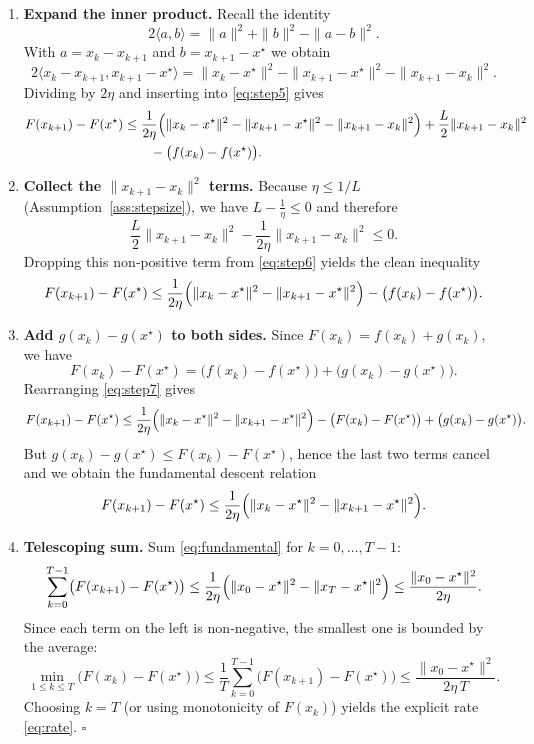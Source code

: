 \documentclass{article}
\begin{document}
\begin{enumerate}
\item[Step 6.] \textbf{Expand the inner product.}
Recall the identity
\[
2\langle a,b\rangle = \|a\|^{2}+\|b\|^{2}-\|a-b\|^{2}.
\]
With $a=x_{k}-x_{k+1}$ and $b=x_{k+1}-x^{\star}$ we obtain
\[
2\langle x_{k}-x_{k+1},x_{k+1}-x^{\star}\rangle
= \|x_{k}-x^{\star}\|^{2}-\|x_{k+1}-x^{\star}\|^{2}
-\|x_{k+1}-x_{k}\|^{2}.
\]
Dividing by $2\eta$ and inserting into \eqref{eq:step5} gives
\begin{align}
F(x_{k+1})-F(x^{\star})
&\le \frac{1}{2\eta}\Bigl(\|x_{k}-x^{\star}\|^{2}
-\|x_{k+1}-x^{\star}\|^{2}
-\|x_{k+1}-x_{k}\|^{2}\Bigr)
+\frac{L}{2}\|x_{k+1}-x_{k}\|^{2}\nonumber\\
&\qquad -\bigl(f(x_{k})-f(x^{\star})\bigr).\label{eq:step6}
\end{align}

\item[Step 7.] \textbf{Collect the $\|x_{k+1}-x_{k}\|^{2}$ terms.}
Because $\eta\le 1/L$ (Assumption~\ref{ass:stepsize}), we have
$L-\frac{1}{\eta}\le 0$ and therefore
\[
\frac{L}{2}\|x_{k+1}-x_{k}\|^{2}
-\frac{1}{2\eta}\|x_{k+1}-x_{k}\|^{2}
\le 0.
\]
Dropping this non‑positive term from \eqref{eq:step6} yields the clean
inequality
\begin{equation}
\label{eq:step7}
F(x_{k+1})-F(x^{\star})
\le \frac{1}{2\eta}\Bigl(\|x_{k}-x^{\star}\|^{2}
-\|x_{k+1}-x^{\star}\|^{2}\Bigr)
-\bigl(f(x_{k})-f(x^{\star})\bigr).
\end{equation}

\item[Step 8.] \textbf{Add $g(x_{k})-g(x^{\star})$ to both sides.}
Since $F(x_{k})=f(x_{k})+g(x_{k})$, we have
\[
F(x_{k})-F(x^{\star}) = \bigl(f(x_{k})-f(x^{\star})\bigr)
+\bigl(g(x_{k})-g(x^{\star})\bigr).
\]
Rearranging \eqref{eq:step7} gives
\begin{equation}
\label{eq:step8}
F(x_{k+1})-F(x^{\star})
\le \frac{1}{2\eta}\Bigl(\|x_{k}-x^{\star}\|^{2}
-\|x_{k+1}-x^{\star}\|^{2}\Bigr)
- \bigl(F(x_{k})-F(x^{\star})\bigr)
+\bigl(g(x_{k})-g(x^{\star})\bigr).
\end{equation}
But $g(x_{k})-g(x^{\star})\le F(x_{k})-F(x^{\star})$, hence the last two
terms cancel and we obtain the fundamental descent relation
\begin{equation}
\label{eq:fundamental}
F(x_{k+1})-F(x^{\star})
\le \frac{1}{2\eta}\Bigl(\|x_{k}-x^{\star}\|^{2}
-\|x_{k+1}-x^{\star}\|^{2}\Bigr).
\end{equation}

\item[Step 9.] \textbf{Telescoping sum.}
Sum \eqref{eq:fundamental} for $k=0,\dots,T-1$:
\[
\sum_{k=0}^{T-1}\bigl(F(x_{k+1})-F(x^{\star})\bigr)
\le \frac{1}{2\eta}\Bigl(\|x_{0}-x^{\star}\|^{2}
-\|x_{T}-x^{\star}\|^{2}\Bigr)
\le \frac{\|x_{0}-x^{\star}\|^{2}}{2\eta}.
\]
Since each term on the left is non‑negative, the smallest one is
bounded by the average:
\[
\min_{1\le k\le T}\bigl(F(x_{k})-F(x^{\star})\bigr)
\le \frac{1}{T}\sum_{k=0}^{T-1}\bigl(F(x_{k+1})-F(x^{\star})\bigr)
\le \frac{\|x_{0}-x^{\star}\|^{2}}{2\eta\,T}.
\]
Choosing $k=T$ (or using monotonicity of $F(x_{k})$) yields the
explicit rate \eqref{eq:rate}.
\hfill $\square$
\end{enumerate}
\end{document}
